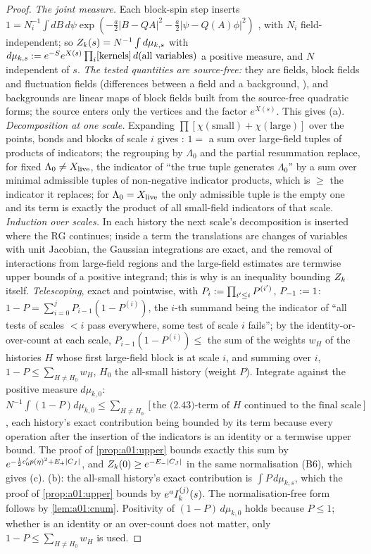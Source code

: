 \begin{proof}
\emph{The joint measure.} Each block-spin step inserts $1=N_i^{-1}\int dB\,d\psi\exp(-\frac a2|B-QA|^2-\frac a2|\psi-Q(A)\phi|^2)$ \cite[(2.1)]{Ba2}, with $N_i$ field-independent; so $Z_{k}(s)=N^{-1}\int d\mu_{k,s}$ with $d\mu_{k,s}:= e^{-S}e^{X(s)}\prod_i[\text{kernels}]\,d(\text{all variables})$ a positive measure, and $N$ independent of $s$. \emph{The tested quantities are source-free:} they are fields, block fields and fluctuation fields (differences between a field and a background, \cite[(3.16)]{K1}), and backgrounds are linear maps of block fields built from the source-free quadratic forms; the source enters only the vertices \cite[(3.20)]{K1} and the factor $e^{X(s)}$. This gives (a). \emph{Decomposition at one scale.} Expanding $\prod[\chi(\text{small})+\chi(\text{large})]$ over the points, bonds and blocks of scale $i$ gives \cite[(2.4)--(2.6)]{Ba2}: $1=$ a sum over large-field tuples of products of indicators; the regrouping by $\Lambda_0$ and the partial resummation \cite[(2.9)--(2.10)]{Ba2} replace, for fixed $\Lambda_0\ne X_{\mathrm{live}}$, the indicator of ``the true tuple generates $\Lambda_0$'' by a sum over minimal admissible tuples of non-negative indicator products, which is $\ge$ the indicator it replaces; for $\Lambda_0=X_{\mathrm{live}}$ the only admissible tuple is the empty one and its term is exactly the product of all small-field indicators of that scale. \emph{Induction over scales.} In each history the next scale's decomposition is inserted where the RG continues; inside a term the translations are changes of variables with unit Jacobian, the Gaussian integrations are exact, and the removal of interactions from large-field regions and the large-field estimates \cite[(2.11)--(2.14)]{Ba2} are termwise upper bounds of a positive integrand; this is why \cite[(2.43)]{Ba2} is an inequality bounding $Z_{k}$ itself. \emph{Telescoping}, exact and pointwise, with $P_i:=\prod_{i'\le i}P^{(i')}$, $P_{-1}:=1$: $1-P=\sum_{i=0}^{j}P_{i-1}(1-P^{(i)})$, the $i$-th summand being the indicator of ``all tests of scales $<i$ pass everywhere, some test of scale $i$ fails''; by the identity-or-over-count at each scale, $P_{i-1}(1-P^{(i)})\le$ the sum of the weights $w_H$ of the histories $H$ whose first large-field block is at scale $i$, and summing over $i$, $1-P\le\sum_{H\ne H_0}w_H$, $H_0$ the all-small history (weight $P$). Integrate against the positive measure $d\mu_{k,0}$: $N^{-1}\int(1-P)d\mu_{k,0}\le\sum_{H\ne H_0}[\text{the (2.43)-term of }H\text{ continued to the final scale}]$, each history's exact contribution being bounded by its term because every operation after the insertion of the indicators is an identity or a termwise upper bound. The proof of \cref{prop:a01:upper} bounds exactly this sum by $e^{-\frac12c_0'p(\eta)^2+E_+|C_J|}$, and $Z_{k}(0)\ge e^{-E_-|C_J|}$ in the same normalisation (B6), which gives (c). (b): the all-small history's exact contribution is $\int P\,d\mu_{k,s}$, which the proof of \cref{prop:a01:upper} bounds by $e^{a}I^{(j)}_{k}(s)$. The normalisation-free form follows by \cref{lem:a01:cnum}. Positivity of $(1-P)\,d\mu_{k,0}$ holds because $P\le1$; whether \cite[(2.9)]{Ba2} is an identity or an over-count does not matter, only $1-P\le\sum_{H\ne H_0}w_H$ is used.
\end{proof}
